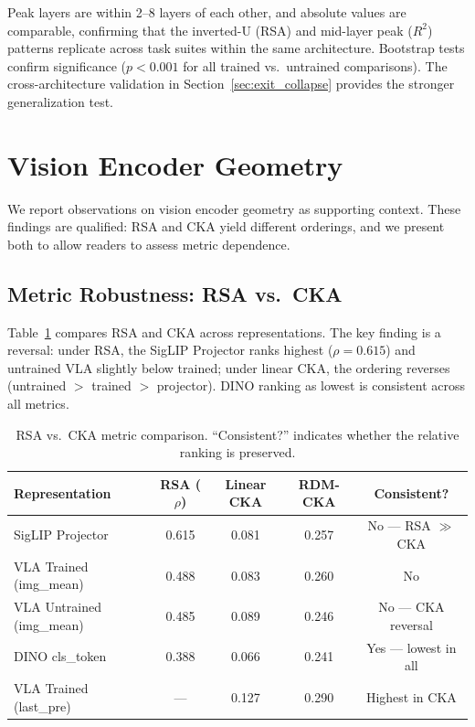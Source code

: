 \documentclass[10pt,letterpaper]{article}
\begin{document}
Peak layers are within 2--8 layers of each other, and absolute values are comparable, confirming that the inverted-U (RSA) and mid-layer peak ($R^2$) patterns replicate across task suites within the same architecture. Bootstrap tests confirm significance ($p < 0.001$ for all trained vs.\ untrained comparisons). The cross-architecture validation in Section~\ref{sec:exit_collapse} provides the stronger generalization test.

\section{Vision Encoder Geometry}
\label{sec:c3}

We report observations on vision encoder geometry as supporting context. These findings are qualified: RSA and CKA yield different orderings, and we present both to allow readers to assess metric dependence.

\subsection{Metric Robustness: RSA vs.\ CKA}
\label{sec:metric_robustness}

Table~\ref{tab:metric_compare} compares RSA and CKA across representations. The key finding is a reversal: under RSA, the SigLIP Projector ranks highest ($\rho = 0.615$) and untrained VLA slightly below trained; under linear CKA, the ordering reverses (untrained $>$ trained $>$ projector). DINO ranking as lowest is consistent across all metrics.

\begin{table}[h]
\centering
\caption{RSA vs.\ CKA metric comparison. ``Consistent?'' indicates whether the relative ranking is preserved.}
\label{tab:metric_compare}
\small
\begin{tabular}{lcccc}
\toprule
Representation & RSA ($\rho$) & Linear CKA & RDM-CKA & Consistent? \\
\midrule
SigLIP Projector & 0.615 & 0.081 & 0.257 & No --- RSA $\gg$ CKA \\
VLA Trained (img\_mean) & 0.488 & 0.083 & 0.260 & No \\
VLA Untrained (img\_mean) & 0.485 & 0.089 & 0.246 & No --- CKA reversal \\
DINO cls\_token & 0.388 & 0.066 & 0.241 & Yes --- lowest in all \\
VLA Trained (last\_pre) & --- & 0.127 & 0.290 & Highest in CKA \\
\bottomrule
\end{tabular}
\end{table}
\end{document}
